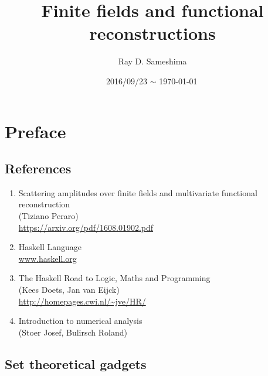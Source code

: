 \documentclass[11pt]{book}
\begin{document}
\lstset{ language = Haskell
         , numbers = left
         , breaklines = true
         , basicstyle = \small\ttfamily
         }

\newcommand{\Slash}[1]{{\ooalign{\hfil/\crcr$#1$}}}

\title{Finite fields and functional reconstructions}
\author{Ray D. Sameshima}
\date{2016/09/23 $\sim$ \today \, \currenttime}
\maketitle

\tableofcontents

\setcounter{chapter}{-1}
\chapter{Preface}
\section{References}
\begin{enumerate}
\item \label{Tiziano}
Scattering amplitudes over finite fields and multivariate functional reconstruction\\
(Tiziano Peraro)\\
\url{https://arxiv.org/pdf/1608.01902.pdf}

\item Haskell Language \\
\url{www.haskell.org}


\item \label{Haskellroad}
The Haskell Road to Logic, Maths and Programming\\ 
(Kees Doets, Jan van Eijck)\\
\url{http://homepages.cwi.nl/~jve/HR/}

\item \label{Numerical}
Introduction to numerical analysis\\ 
(Stoer Josef, Bulirsch Roland)

\end{enumerate}

\section{Set theoretical gadgets}
\end{document}
